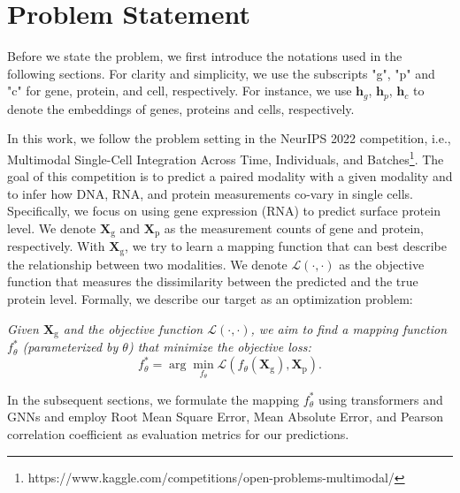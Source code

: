 \section{Problem Statement}

Before we state the problem, we first introduce the notations used in the following sections. For clarity and simplicity, we use the subscripts "g", "p" and "c" for gene, protein, and cell, respectively. For instance, we use $\mathbf{h}_g$, $\mathbf{h}_p$, $\mathbf{h}_c$ to denote the embeddings of genes, proteins and cells, respectively.

In this work, we follow the problem setting in the NeurIPS 2022 competition, i.e., Multimodal Single-Cell Integration Across Time, Individuals, and Batches\footnote{https://www.kaggle.com/competitions/open-problems-multimodal/}. The goal of this competition is to predict a paired modality with a given modality and to infer how DNA, RNA, and protein measurements co-vary in single cells. Specifically, we focus on using gene expression (RNA) to predict surface protein level. We denote $\mathbf{X}_{\text{g}}$ and $\mathbf{X}_{\text{p}}$ as the measurement counts of gene and protein, respectively. With $\mathbf{X}_{\text{g}}$, we try to learn a mapping function that can best describe the relationship between two modalities. We denote $\mathcal{L} \left(\cdot,\cdot\right)$ as the objective function that measures the dissimilarity between the predicted and the true protein level. Formally, we describe our target as an optimization problem:

\textit{Given $\mathbf{X}_{\text{g}}$ and the objective function $\mathcal{L}\left(\cdot,\cdot\right)$, we aim to find a mapping function $f_{\theta}^*$ (parameterized by $\theta$) that minimize the objective loss:
\begin{equation}
    f_{\theta}^* = \arg\min_{f_{\theta}} \mathcal{L} \left( f_{\theta} \left(\mathbf{X}_{\text{g}}\right), \mathbf{X}_{\text{p}}\right).
\end{equation}}

In the subsequent sections, we formulate the mapping $f_{\theta}^*$ using transformers and GNNs and employ Root Mean Square Error, Mean Absolute Error, and Pearson correlation coefficient as evaluation metrics for our predictions.